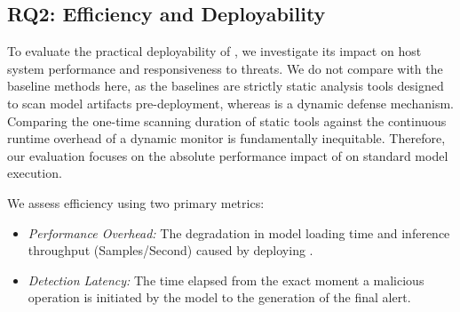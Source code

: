 \subsection{RQ2: Efficiency and Deployability}

To evaluate the practical deployability of \toolname{}, we investigate its impact on host system performance and responsiveness to threats. We do not compare \toolname{} with the baseline methods here, as the baselines are strictly static analysis tools designed to scan model artifacts pre-deployment, whereas \toolname{} is a dynamic defense mechanism. Comparing the one-time scanning duration of static tools against the continuous runtime overhead of a dynamic monitor is fundamentally inequitable. Therefore, our evaluation focuses on the absolute performance impact of \toolname{} on standard model execution.

We assess efficiency using two primary metrics:
\begin{itemize}
    \item \emph{Performance Overhead:} The degradation in model loading time and inference throughput (Samples/Second) caused by deploying \toolname{}.
    \item \emph{Detection Latency:} The time elapsed from the exact moment a malicious operation is initiated by the model to the generation of the final alert.
\end{itemize}
\begin{table}[t!]
    \scriptsize
    \centering
    \caption{Runtime overhead and detection latency of \toolname{}.}
    \label{tab:overhead_result}
\end{table}

